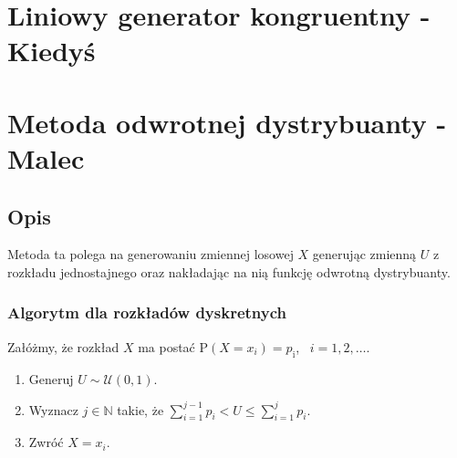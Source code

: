 \documentclass[12pt]{mwrep}
\begin{document}
	
	
	
	
	
	
	



	\section{Liniowy generator kongruentny - Kiedyś}


	
	\section{Metoda odwrotnej dystrybuanty - Malec}
	
	\subsection{Opis}
	\noindent Metoda ta polega na generowaniu zmiennej losowej $X$ generując zmienną $U$ z rozkładu jednostajnego oraz nakładając na nią funkcję odwrotną dystrybuanty.
	\subsubsection{Algorytm dla rozkładów dyskretnych}
	\noindent Załóżmy, że rozkład $X$ ma postać $\mathrm{P}(X = x_i) = p_\mathrm{i}$, \ $i = 1, 2,\dots $.
	\begin{enumerate}[leftmargin=10mm]
		\item Generuj $U \sim \mathcal{U}(0, 1)$.
		\item Wyznacz $j \in \mathbb{N} $ takie, że $ \sum\limits_{i=1}^{j-1} p_i < U \leqslant \sum\limits_{i=1}^{j} p_i $.
		\item Zwróć $ X = x_i $.
	\end{enumerate}
\end{document}
